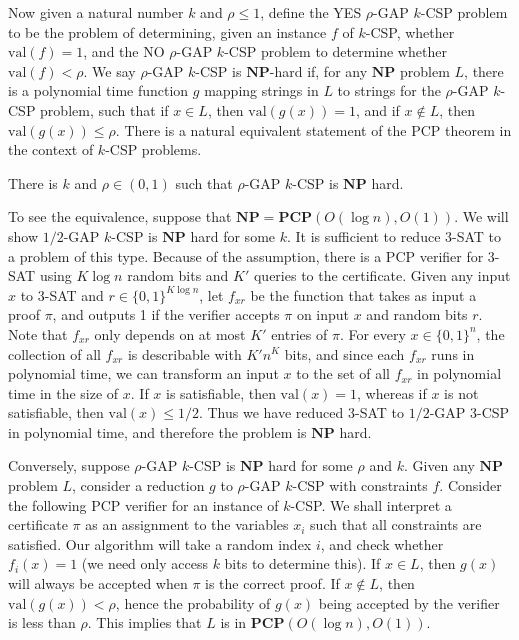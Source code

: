 Now given a natural number $k$ and $\rho \leq 1$, define the YES $\rho$-GAP $k$-CSP problem to be the problem of determining, given an instance $f$ of $k$-CSP, whether $\text{val}(f) = 1$, and the NO $\rho$-GAP $k$-CSP problem to determine whether $\text{val}(f) < \rho$. We say $\rho$-GAP $k$-CSP is $\mathbf{NP}$-hard if, for any $\mathbf{NP}$ problem $L$, there is a polynomial time function $g$ mapping strings in $L$ to strings for the $\rho$-GAP $k$-CSP problem, such that if $x \in L$, then $\text{val}(g(x)) = 1$, and if $x \not \in L$, then $\text{val}(g(x)) \leq \rho$. There is a natural equivalent statement of the PCP theorem in the context of $k$-CSP problems.

\begin{theorem}
    There is $k$ and $\rho \in (0,1)$ such that $\rho$-GAP $k$-CSP is $\mathbf{NP}$ hard.
\end{theorem}

To see the equivalence, suppose that $\mathbf{NP} = \mathbf{PCP}(O(\log n), O(1))$. We will show $1/2$-GAP $k$-CSP is $\mathbf{NP}$ hard for some $k$. It is sufficient to reduce $3$-SAT to a problem of this type. Because of the assumption, there is a PCP verifier for 3-SAT using $K \log n$ random bits and $K'$ queries to the certificate. Given any input $x$ to 3-SAT and $r \in \{ 0, 1 \}^{K \log n}$, let $f_{xr}$ be the function that takes as input a proof $\pi$, and outputs 1 if the verifier accepts $\pi$ on input $x$ and random bits $r$. Note that $f_{xr}$ only depends on at most $K'$ entries of $\pi$. For every $x \in \{ 0, 1 \}^n$, the collection of all $f_{xr}$ is describable with $K' n^K$ bits, and since each $f_{xr}$ runs in polynomial time, we can transform an input $x$ to the set of all $f_{xr}$ in polynomial time in the size of $x$. If $x$ is satisfiable, then $\text{val}(x) = 1$, whereas if $x$ is not satisfiable, then $\text{val}(x) \leq 1/2$. Thus we have reduced 3-SAT to $1/2$-GAP 3-CSP in polynomial time, and therefore the problem is $\mathbf{NP}$ hard.

Conversely, suppose $\rho$-GAP $k$-CSP is $\mathbf{NP}$ hard for some $\rho$ and $k$. Given any $\mathbf{NP}$ problem $L$, consider a reduction $g$ to $\rho$-GAP $k$-CSP with constraints $f$. Consider the following PCP verifier for an instance of $k$-CSP. We shall interpret a certificate $\pi$ as an assignment to the variables $x_i$ such that all constraints are satisfied. Our algorithm will take a random index $i$, and check whether $f_i(x) = 1$ (we need only access $k$ bits to determine this). If $x \in L$, then $g(x)$ will always be accepted when $\pi$ is the correct proof. If $x \not \in L$, then $\text{val}(g(x)) < \rho$, hence the probability of $g(x)$ being accepted by the verifier is less than $\rho$. This implies that $L$ is in $\mathbf{PCP}(O(\log n), O(1))$.

